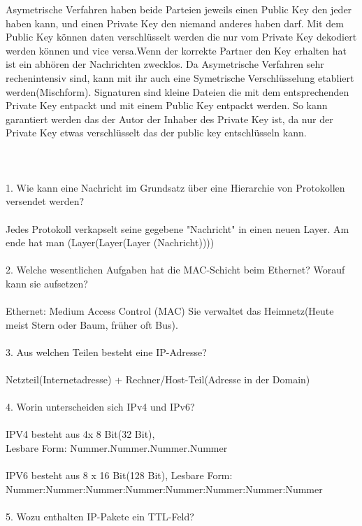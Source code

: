 \documentclass{article}
\begin{document}
Asymetrische Verfahren haben beide Parteien jeweils einen Public Key den jeder haben kann, und einen Private Key den niemand anderes haben darf. Mit dem Public Key k\"onnen daten verschl\"usselt werden die nur vom Private Key dekodiert werden k\"onnen und vice versa.Wenn der korrekte Partner den Key erhalten hat ist ein abh\"oren der Nachrichten zwecklos.
Da  Asymetrische Verfahren sehr rechenintensiv sind, kann mit ihr auch eine Symetrische Verschl\"usselung etabliert werden(Mischform).
Signaturen sind kleine Dateien die mit dem entsprechenden Private Key entpackt und mit einem Public Key entpackt werden. So kann garantiert werden das der Autor der Inhaber des Private Key ist, da nur der Private Key etwas verschl\"usselt das der public key entschl\"usseln kann.
\\
\\
\\
\\1. Wie kann eine Nachricht im Grundsatz über eine Hierarchie von Protokollen versendet werden?
\\
\\
Jedes Protokoll verkapselt seine gegebene "Nachricht" in einen neuen Layer. Am ende hat man (Layer(Layer(Layer (Nachricht))))
\\
\\
2. Welche wesentlichen Aufgaben hat die MAC-Schicht beim Ethernet? Worauf kann sie aufsetzen?
\\
\\
Ethernet: Medium Access Control (MAC) Sie verwaltet das Heimnetz(Heute meist Stern oder Baum, früher oft Bus).
\\
\\
3. Aus welchen Teilen besteht eine IP-Adresse?
\\
\\
Netzteil(Internetadresse) + Rechner/Host-Teil(Adresse in der Domain)
\\
\\
4. Worin unterscheiden sich IPv4 und IPv6?
\\
\\
IPV4 besteht aus 4x 8 Bit(32 Bit),\\ Lesbare Form: Nummer.Nummer.Nummer.Nummer
\\
\\
IPV6 besteht aus 8 x 16 Bit(128 Bit), Lesbare Form:\\ Nummer:Nummer:Nummer:Nummer:Nummer:Nummer:Nummer:Nummer
\\
\\
5. Wozu enthalten IP-Pakete ein TTL-Feld?
\end{document}
